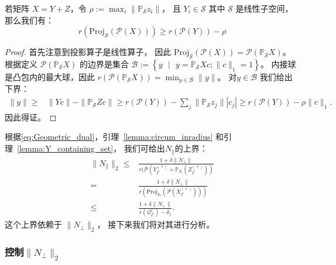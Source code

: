 \documentclass{ctexart}
\begin{document}
\begin{lemma}\label{lemma:Y_containing_set}
  若矩阵 $X=Y+Z$，令 $\rho:=\max_{i}\|\mathbb{P}_\mathcal{S}z_i\|$， 且 $Y_i \in \mathcal{S}$ 其中
  $\mathcal{S}$ 是线性子空间， 那么我们有：
  \begin{equation*}
    r(\mathrm{Proj}_\mathcal{S} (\mathcal{P}(X))) \geq r(\mathcal{P}(Y)) - \rho
  \end{equation*}
\end{lemma}
\begin{proof}
  首先注意到投影算子是线性算子， 因此 $\mathrm{Proj}_\mathcal{S}(\mathcal{P}(X))=\mathcal{P}(\mathbb{P}_\mathcal{S} X)$。
  根据定义 $\mathcal{P}(\mathbb{P}_\mathcal{S} X)$ 的边界是集合 $\mathcal{B}:=
  \left\{y\text{ }|\text{ }y=\mathbb{P}_\mathcal{S} X c; \|c\|_1=1\right\}$。
  内接球是凸包内的最大球，因此 $r(\mathcal{P}(\mathbb{P}_\mathcal{S} X)) =
  \min_{y\in \mathcal{B}} \|y\|$。 对$y \in \mathcal{B} $ 我们给出下界：
  \begin{align*}
    \|y\| \geq& \|Yc\|-\|\mathbb{P}_\mathcal{S}Z c\|\geq r(\mathcal{P}(Y)) - {\sum}_j{\|\mathbb{P}_\mathcal{S}z_j}\||c_j|
    \geq r(\mathcal{P}(Y)) - \rho\|c\|_1.
  \end{align*}
  因此得证。
\end{proof}

根据\eqref{eq:Geometric_dual}，引理~\ref{lemma:circum_inradius} 和引理~\ref{lemma:Y_containing_set}，
我们可给出$N_{\parallel}$的上界：
\begin{align}
  \|N_{\parallel}\|_2 \leq& \frac{1+\delta\|N_{\perp}\|}
  {r(\mathcal{P}(Y_{I^c}^{(\ell)}+\mathbb{P}_{\mathcal{S}_{\ell}}(Z_{I^c}^{(\ell)}))}
  \nonumber \\
  =& \frac{1+\delta\|N_{\perp}\|}{r(\mathrm{Proj}_\mathcal{S_{\ell}}
  (\mathcal{P}(X_{I^c}^{(\ell)})))} \nonumber \\
  \leq& \frac{1+\delta\|N_{\perp}\|}{r{\left( \mathcal{Q}_{I^c}^{\ell}\right)}-\delta_1}.\label{eq:nu1_bound}
\end{align}
这个上界依赖于 $\|N_{\perp}\|_2$， 接下来我们将对其进行分析。


\subsubsection{控制$\|N_{\perp}\|_2$}
\end{document}
